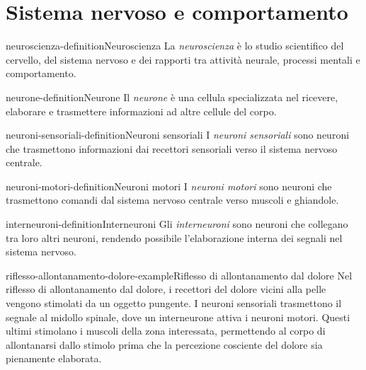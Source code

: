 \documentclass[preview]{standalone}
\begin{document}
\genpage

\section{Sistema nervoso e comportamento}

\begin{snippetdefinition}{neuroscienza-definition}{Neuroscienza}
    La \emph{neuroscienza} è lo studio scientifico del cervello, del sistema
    nervoso e dei rapporti tra attività neurale, processi mentali e
    comportamento.
\end{snippetdefinition}

\begin{snippetdefinition}{neurone-definition}{Neurone}
    Il \emph{neurone} è una cellula specializzata nel ricevere, elaborare e
    trasmettere informazioni ad altre cellule del corpo.
\end{snippetdefinition}

\begin{snippetdefinition}{neuroni-sensoriali-definition}{Neuroni sensoriali}
    I \emph{neuroni sensoriali} sono neuroni che trasmettono informazioni dai
    recettori sensoriali verso il sistema nervoso centrale.
\end{snippetdefinition}

\begin{snippetdefinition}{neuroni-motori-definition}{Neuroni motori}
    I \emph{neuroni motori} sono neuroni che trasmettono comandi dal sistema
    nervoso centrale verso muscoli e ghiandole.
\end{snippetdefinition}

\begin{snippetdefinition}{interneuroni-definition}{Interneuroni}
    Gli \emph{interneuroni} sono neuroni che collegano tra loro altri neuroni,
    rendendo possibile l'elaborazione interna dei segnali nel sistema nervoso.
\end{snippetdefinition}

\begin{snippetexample}{riflesso-allontanamento-dolore-example}{Riflesso di allontanamento dal dolore}
    Nel riflesso di allontanamento dal dolore, i recettori del dolore vicini
    alla pelle vengono stimolati da un oggetto pungente. I neuroni sensoriali
    trasmettono il segnale al midollo spinale, dove un interneurone attiva i
    neuroni motori. Questi ultimi stimolano i muscoli della zona interessata,
    permettendo al corpo di allontanarsi dallo stimolo prima che la percezione
    cosciente del dolore sia pienamente elaborata.
\end{snippetexample}
\end{document}

